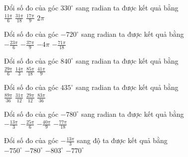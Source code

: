 \documentclass[12pt,a4paper]{article}
\begin{document}
\begin{ex}
 Đổi số đo của góc $330^\circ$ sang radian ta được kết quả bằng\\ 
\choice
{ \True $\frac{11 \pi}{6}$ }
   { $\frac{31 \pi}{18}$ }
     { $\frac{17 \pi}{9}$ }
    { $2 \pi$ }
\end{ex}

\begin{ex}
 Đổi số đo của góc $-720^\circ$ sang radian ta được kết quả bằng\\ 
\choice
{ $- \frac{23 \pi}{6}$ }
   { $- \frac{37 \pi}{9}$ }
     { \True $- 4 \pi$ }
    { $- \frac{71 \pi}{18}$ }
\end{ex}

\begin{ex}
 Đổi số đo của góc $840^\circ$ sang radian ta được kết quả bằng\\ 
\choice
{ $\frac{29 \pi}{6}$ }
   { \True $\frac{14 \pi}{3}$ }
     { $\frac{85 \pi}{18}$ }
    { $\frac{41 \pi}{9}$ }
\end{ex}

\begin{ex}
 Đổi số đo của góc $435^\circ$ sang radian ta được kết quả bằng\\ 
\choice
{ $\frac{89 \pi}{36}$ }
   { $\frac{31 \pi}{12}$ }
     { \True $\frac{29 \pi}{12}$ }
    { $\frac{83 \pi}{36}$ }
\end{ex}

\begin{ex}
 Đổi số đo của góc $-780^\circ$ sang radian ta được kết quả bằng\\ 
\choice
{ \True $- \frac{13 \pi}{3}$ }
   { $- \frac{25 \pi}{6}$ }
     { $- \frac{40 \pi}{9}$ }
    { $- \frac{77 \pi}{18}$ }
\end{ex}

\begin{ex}
 Đổi số đo của góc $- \frac{13 \pi}{3}$ sang độ ta được kết quả bằng\\ 
\choice
{ $-750^\circ$ }
   { \True $-780^\circ$ }
     { $-803^\circ$ }
    { $-770^\circ$ }
\end{ex}
\end{document}
